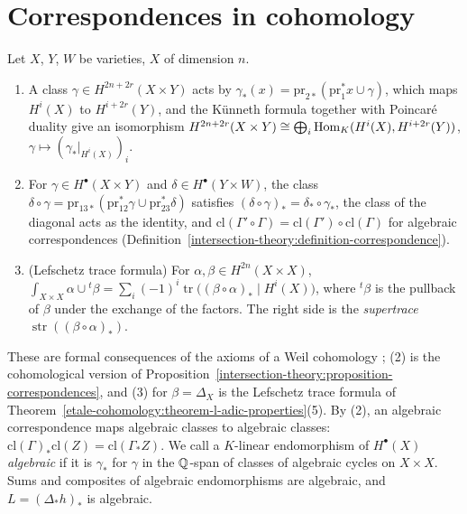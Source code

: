 \section{Correspondences in cohomology}\label{standard-conjectures:section-correspondences}

\begin{proposition}\label{standard-conjectures:proposition-cohomological-correspondences}
Let $X$, $Y$, $W$ be varieties, $X$ of dimension $n$.
\begin{enumerate}
\item A class $\gamma \in H^{2n+2r}(X \times Y)$ acts by $\gamma_*(x) = \mathrm{pr}_{2*}(\mathrm{pr}_1^*x \cup \gamma)$, which maps $H^i(X)$ to $H^{i+2r}(Y)$, and the K\"unneth formula together with Poincar\'e duality
give an isomorphism $H^{2n+2r}(X \times Y) \cong \bigoplus_i\operatorname{Hom}_K(H^i(X), H^{i+2r}(Y))$, $\gamma \mapsto (\gamma_*|_{H^i(X)})_i$.
\item For $\gamma \in H^\bullet(X \times Y)$ and $\delta \in H^\bullet(Y \times W)$, the class $\delta \circ \gamma = \mathrm{pr}_{13*}(\mathrm{pr}_{12}^*\gamma \cup \mathrm{pr}_{23}^*\delta)$ satisfies
$(\delta \circ \gamma)_* = \delta_* \circ \gamma_*$, the class of the diagonal acts as the identity, and $\mathrm{cl}(\Gamma' \circ \Gamma) = \mathrm{cl}(\Gamma') \circ \mathrm{cl}(\Gamma)$ for algebraic correspondences
(Definition~\ref{intersection-theory:definition-correspondence}).
\item (Lefschetz trace formula) For $\alpha, \beta \in H^{2n}(X \times X)$, $\int_{X \times X}\alpha \cup {}^t\beta = \sum_i(-1)^i\operatorname{tr}\big((\beta \circ \alpha)_* \mid H^i(X)\big)$, where ${}^t\beta$ is the pullback of
$\beta$ under the exchange of the factors. The right side is the \emph{supertrace} $\operatorname{str}((\beta \circ \alpha)_*)$.
\end{enumerate}
\end{proposition}

These are formal consequences of the axioms of a Weil cohomology \cite{kleiman-1968}; (2) is the cohomological version of Proposition~\ref{intersection-theory:proposition-correspondences}, and (3)
for $\beta = \Delta_X$ is the Lefschetz trace formula of Theorem~\ref{etale-cohomology:theorem-l-adic-properties}(5). By (2), an algebraic correspondence maps algebraic classes to algebraic classes:
$\mathrm{cl}(\Gamma)_*\mathrm{cl}(Z) = \mathrm{cl}(\Gamma_*Z)$. We call a $K$-linear endomorphism of $H^\bullet(X)$ \emph{algebraic} if it is $\gamma_*$ for $\gamma$ in the $\mathbb{Q}$-span of classes of algebraic cycles on
$X \times X$. Sums and composites of algebraic endomorphisms are algebraic, and $L = (\Delta_*h)_*$ is algebraic.

